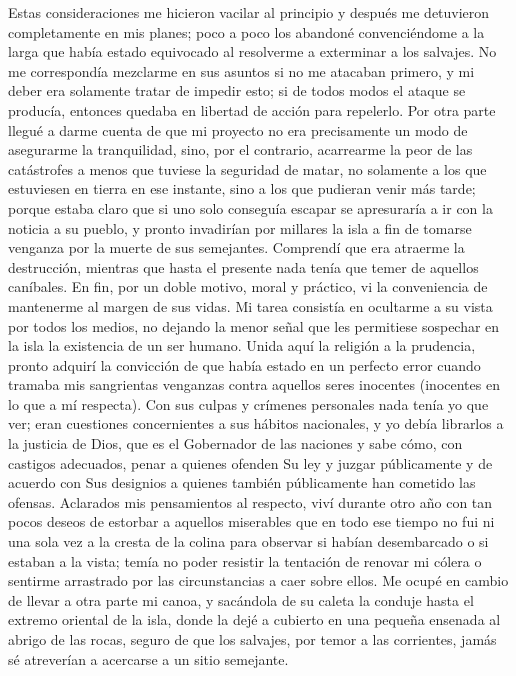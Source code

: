 \documentclass{novela}
\begin{document}
    Estas consideraciones me hicieron vacilar al principio y después me detuvieron completamente en mis planes; poco a poco los abandoné convenciéndome a la larga que había estado equivocado al resolverme a exterminar a los salvajes. No me correspondía mezclarme en sus asuntos si no me atacaban primero, y mi deber era solamente tratar de impedir esto; si de todos modos el ataque se producía, entonces quedaba en libertad de acción para repelerlo.
    Por otra parte llegué a darme cuenta de que mi proyecto no era precisamente un modo de asegurarme la tranquilidad, sino, por el contrario, acarrearme la peor de las catástrofes a menos que tuviese la seguridad de matar, no solamente a los que estuviesen en tierra en ese instante, sino a los que pudieran venir más tarde; porque estaba claro que si uno solo conseguía escapar se apresuraría a ir con la noticia a su pueblo, y pronto invadirían por millares la isla a fin de tomarse venganza por la muerte de sus semejantes. Comprendí que era atraerme la destrucción, mientras que hasta el presente nada tenía que temer de aquellos caníbales.
    En fin, por un doble motivo, moral y práctico, vi la conveniencia de mantenerme al margen de sus vidas. Mi tarea consistía en ocultarme a su vista por todos los medios, no dejando la menor señal que les permitiese sospechar en la isla la existencia de un ser humano.
    Unida aquí la religión a la prudencia, pronto adquirí la convicción de que había estado en un perfecto error cuando tramaba mis sangrientas venganzas contra aquellos seres inocentes (inocentes en lo que a mí respecta). Con sus culpas y crímenes personales nada tenía yo que ver; eran cuestiones concernientes a sus hábitos nacionales, y yo debía librarlos a la justicia de Dios, que es el Gobernador de las naciones y sabe cómo, con castigos adecuados, penar a quienes ofenden Su ley y juzgar públicamente y de acuerdo con Sus designios a quienes también públicamente han cometido las ofensas.
    Aclarados mis pensamientos al respecto, viví durante otro año con tan pocos deseos de estorbar a aquellos miserables que en todo ese tiempo no fui ni una sola vez a la cresta de la colina para observar si habían desembarcado o si estaban a la vista; temía no poder resistir la tentación de renovar mi cólera o sentirme arrastrado por las circunstancias a caer sobre ellos. Me ocupé en cambio de llevar a otra parte mi canoa, y sacándola de su caleta la conduje hasta el extremo oriental de la isla, donde la dejé a cubierto en una pequeña ensenada al abrigo de las rocas, seguro de que los salvajes, por temor a las corrientes, jamás sé atreverían a acercarse a un sitio semejante.
\end{document}
